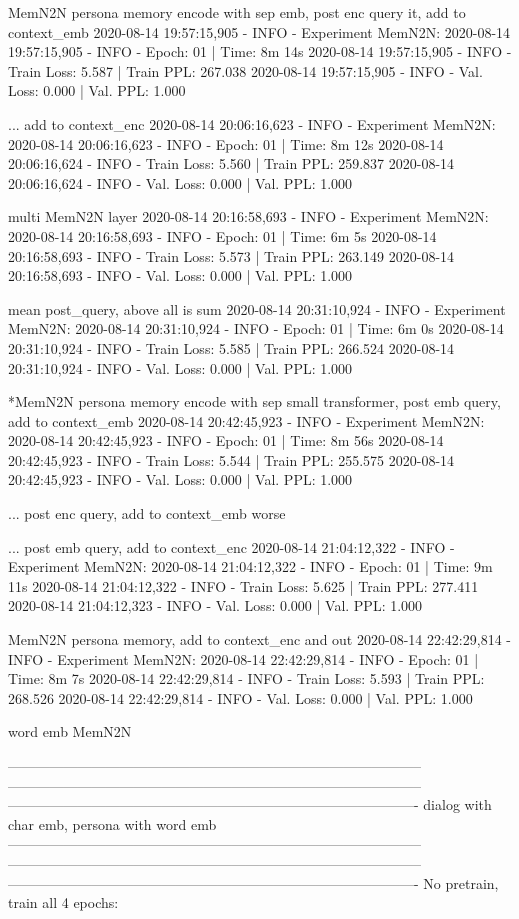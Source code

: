 \documentclass[letterpaper]{article} %
\begin{document}
\begin{CJK*}{UTF8}{gbsn}
MemN2N persona memory encode with sep emb, post enc query it, add to context_emb
2020-08-14 19:57:15,905 - INFO - Experiment MemN2N: 
2020-08-14 19:57:15,905 - INFO - Epoch: 01 | Time: 8m 14s
2020-08-14 19:57:15,905 - INFO - 	Train Loss: 5.587 | Train PPL: 267.038
2020-08-14 19:57:15,905 - INFO - 	 Val. Loss: 0.000 |  Val. PPL:   1.000

... add to context_enc
2020-08-14 20:06:16,623 - INFO - Experiment MemN2N: 
2020-08-14 20:06:16,623 - INFO - Epoch: 01 | Time: 8m 12s
2020-08-14 20:06:16,624 - INFO - 	Train Loss: 5.560 | Train PPL: 259.837
2020-08-14 20:06:16,624 - INFO - 	 Val. Loss: 0.000 |  Val. PPL:   1.000

multi MemN2N layer
2020-08-14 20:16:58,693 - INFO - Experiment MemN2N: 
2020-08-14 20:16:58,693 - INFO - Epoch: 01 | Time: 6m 5s
2020-08-14 20:16:58,693 - INFO - 	Train Loss: 5.573 | Train PPL: 263.149
2020-08-14 20:16:58,693 - INFO - 	 Val. Loss: 0.000 |  Val. PPL:   1.000


mean post_query, above all is sum
2020-08-14 20:31:10,924 - INFO - Experiment MemN2N: 
2020-08-14 20:31:10,924 - INFO - Epoch: 01 | Time: 6m 0s
2020-08-14 20:31:10,924 - INFO - 	Train Loss: 5.585 | Train PPL: 266.524
2020-08-14 20:31:10,924 - INFO - 	 Val. Loss: 0.000 |  Val. PPL:   1.000

*MemN2N persona memory encode with sep small transformer, post emb query, add to context_emb
2020-08-14 20:42:45,923 - INFO - Experiment MemN2N: 
2020-08-14 20:42:45,923 - INFO - Epoch: 01 | Time: 8m 56s
2020-08-14 20:42:45,923 - INFO - 	Train Loss: 5.544 | Train PPL: 255.575
2020-08-14 20:42:45,923 - INFO - 	 Val. Loss: 0.000 |  Val. PPL:   1.000

... post enc query, add to context_emb
worse

... post emb query, add to context_enc
2020-08-14 21:04:12,322 - INFO - Experiment MemN2N: 
2020-08-14 21:04:12,322 - INFO - Epoch: 01 | Time: 9m 11s
2020-08-14 21:04:12,322 - INFO - 	Train Loss: 5.625 | Train PPL: 277.411
2020-08-14 21:04:12,323 - INFO - 	 Val. Loss: 0.000 |  Val. PPL:   1.000

MemN2N persona memory, add to context_enc and out
2020-08-14 22:42:29,814 - INFO - Experiment MemN2N: 
2020-08-14 22:42:29,814 - INFO - Epoch: 01 | Time: 8m 7s
2020-08-14 22:42:29,814 - INFO - 	Train Loss: 5.593 | Train PPL: 268.526
2020-08-14 22:42:29,814 - INFO - 	 Val. Loss: 0.000 |  Val. PPL:   1.000

word emb MemN2N


-----------------------------------------------------------------------------------------
-----------------------------------------------------------------------------------------
----------------------------------------------------------------------------------------
dialog with char emb, persona with word emb
-----------------------------------------------------------------------------------------
-----------------------------------------------------------------------------------------
----------------------------------------------------------------------------------------
No pretrain, train all 4 epochs:


\end{CJK*}
\end{document}

